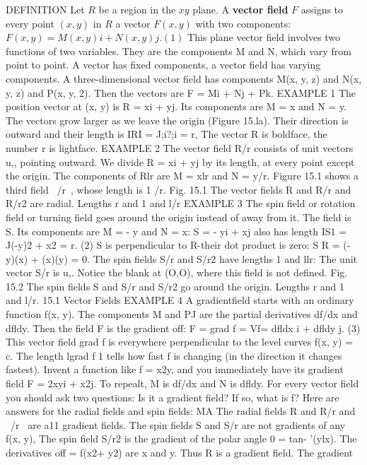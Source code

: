 DEFINITION Let $R$ be a region in the $xy$ plane. A \textbf{vector field}  $F$ assigns to every point
$(x, y)$ in $R$ a vector $F(x, y)$ with two components:
$F(x, y) = M(x, y)i + N(x, y)j. (1)$
This plane vector field involves two functions of two variables. They are the components
M and N, which vary from point to point. A vector has fixed components, a
vector field has varying components.
A three-dimensional vector field has components M(x, y, z) and N(x, y, z) and
P(x, y, 2). Then the vectors are F = Mi + Nj + Pk.
EXAMPLE 1 The position vector at (x, y) is R = xi + yj. Its components are M = x
and N = y. The vectors grow larger as we leave the origin (Figure 15.la). Their
direction is outward and their length is IRI = J;i?;i = r, The vector R is boldface,
the number r is lightface.
EXAMPLE 2 The vector field R/r consists of unit vectors u,, pointing outward. We
divide R = xi + yj by its length, at every point except the origin. The components
of Rlr are M = xlr and N = y/r. Figure 15.1 shows a third field ~/r~, whose length
is 1 /r.
Fig. 15.1 The vector fields R and R/r and R/r2 are radial. Lengths r and 1 and l/r
EXAMPLE 3 The spin field or rotation field or turning field goes around the origin
instead of away from it. The field is S. Its components are M = - y and N = x:
S = - yi + xj also has length IS1 = J(-y)2 + x2 = r. (2)
S is perpendicular to R-their dot product is zero: S R = (- y)(x) + (x)(y) = 0. The
spin fields S/r and S/r2 have lengths 1 and llr:
The unit vector S/r is u,. Notice the blank at (O,O), where this field is not defined.
Fig. 15.2 The spin fields S and S/r and S/r2 go around the origin. Lengths r and 1 and l/r. 
15.1 Vector Fields
EXAMPLE 4 A gradientfield starts with an ordinary function f(x, y). The components
M and PJ are the partial derivatives df/dx and dfldy. Then the field F is the gradient
off:
F = grad f = Vf= dfldx i + dfldy j. (3)
This vector field grad f is everywhere perpendicular to the level curves f(x, y) = c. The
length lgrad f 1 tells how fast f is changing (in the direction it changes fastest). Invent
a function like f = x2y, and you immediately have its gradient field F = 2xyi + x2j.
To repealt, M is df/dx and N is dfldy.
For every vector field you should ask two questions: Is it a gradient field? If so,
what is f? Here are answers for the radial fields and spin fields:
MA The radial fields R and R/r and ~/r~ are a11 gradient fields.
The spin fields S and S/r are not gradients of any f(x, y),
The spin field S/r2 is the gradient of the polar angle 0 = tan- '(ylx).
The derivatives off = f(x2+ y2) are x and y. Thus R is a gradient field. The gradient
